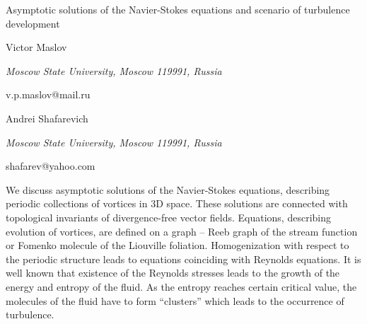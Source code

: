 \documentclass[10pt,a4paper]{article}
\begin{document}
\begin{center}

{\Large Asymptotic solutions of the Navier-Stokes equations and scenario of turbulence development}

\bigskip

{\sc Victor Maslov}

{\small\it Moscow State University, Moscow 119991, Russia}

{\small\rm v.p.maslov@mail.ru}

\bigskip

{\sc Andrei Shafarevich}

{\small\it Moscow State University, Moscow 119991, Russia}

{\small\rm shafarev@yahoo.com}

\end{center}

\bigskip


We discuss asymptotic solutions of the Navier-Stokes equations,
describing periodic collections of vortices in 3D space.
These solutions are connected with topological invariants
of divergence-free vector fields.
Equations, describing evolution of vortices,
are defined on a graph -- Reeb graph of the stream function
or Fomenko molecule of the Liouville foliation.
Homogenization with respect to
the periodic structure leads to equations
coinciding with Reynolds equations.
It is well known that existence of the Reynolds stresses leads
to the growth of the energy and entropy of the fluid.
As the entropy reaches certain critical value,
the molecules of the fluid have to form
``clusters'' which leads to the occurrence of turbulence.
\end{document}
